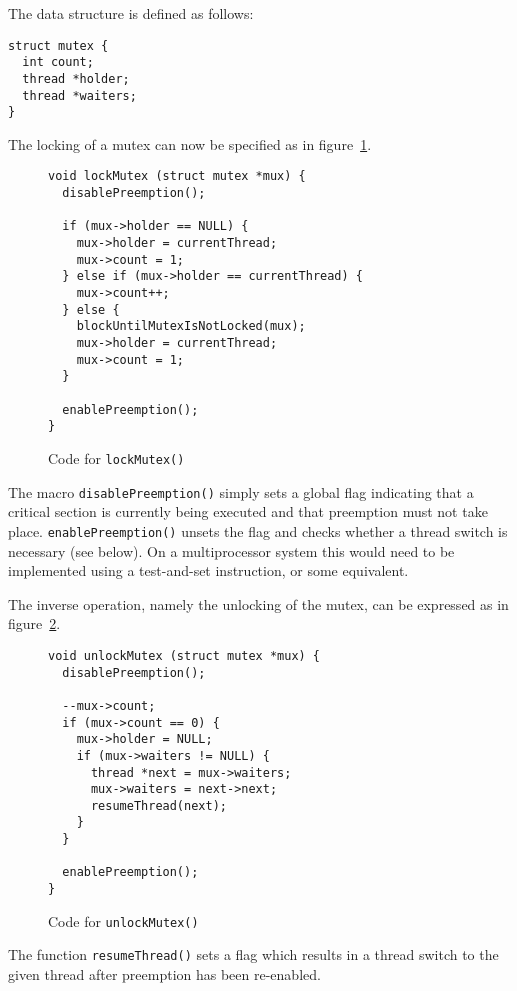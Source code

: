 The data structure is defined as follows:

\begin{verbatim}
struct mutex {
  int count;
  thread *holder;
  thread *waiters;
}
\end{verbatim}

The locking of a mutex can now be specified as in
figure~\ref{lockMutex}.

\begin{figure}
\begin{verbatim}
void lockMutex (struct mutex *mux) {
  disablePreemption();

  if (mux->holder == NULL) {
    mux->holder = currentThread;
    mux->count = 1;
  } else if (mux->holder == currentThread) {
    mux->count++;
  } else {
    blockUntilMutexIsNotLocked(mux);
    mux->holder = currentThread;
    mux->count = 1;
  }

  enablePreemption();
}
\end{verbatim}
\caption{Code for \texttt{lockMutex()}}
\label{lockMutex}
\end{figure}

The macro \texttt{disablePreemption()} simply sets a global flag
indicating that a critical section is currently being executed and
that preemption must not take place. \texttt{enablePreemption()}
unsets the flag and checks whether a thread switch is necessary (see
below). On a multiprocessor system this would need to be implemented
using a test-and-set instruction, or some equivalent.

The inverse operation, namely the unlocking of the mutex, can be
expressed as in figure~\ref{unlockMutex}.

\begin{figure}
\begin{verbatim}
void unlockMutex (struct mutex *mux) {
  disablePreemption();

  --mux->count;
  if (mux->count == 0) {
    mux->holder = NULL;
    if (mux->waiters != NULL) {
      thread *next = mux->waiters;
      mux->waiters = next->next;
      resumeThread(next);
    }
  }

  enablePreemption();
}
\end{verbatim}
\caption{Code for \texttt{unlockMutex()}}
\label{unlockMutex}
\end{figure}

The function \texttt{resumeThread()} sets a flag which results in a
thread switch to the given thread after preemption has been
re-enabled.

